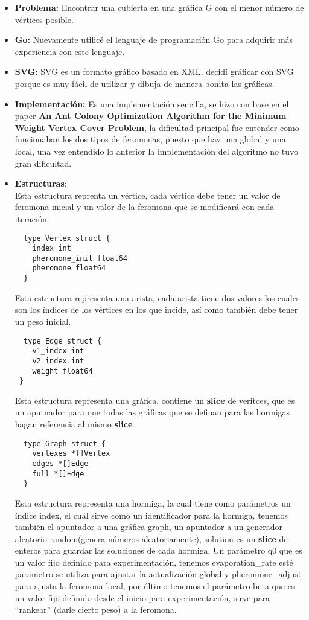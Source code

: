 \documentclass[a4paper, 11pt, spanish, oneside]{book}
\begin{document}
\begin{itemize}
 \item\textbf{Problema:} Encontrar una cubierta en una gráfica G con el menor número de vértices posible.
 \item\textbf{Go:} Nuevamente utilicé el lenguaje de programación Go para adquirir más experiencia con este lenguaje.
 \item\textbf{SVG:} SVG es un formato gráfico basado en XML, decidí gráficar con SVG porque es muy fácil de utilizar y dibuja de manera bonita las gráficas.
 \item\textbf{Implementación:} Es una implementación sencilla, se hizo con base en el paper \textbf{An Ant Colony Optimization Algorithm for the Minimum Weight Vertex Cover Problem}, la dificultad principal fue entender como funcionaban los dos tipos de feromonas, puesto que hay una global y una local, una vez entendido lo anterior la implementación del algoritmo no tuvo gran dificultad.
 \item\textbf{Estructuras}:\\
 Esta estructura reprenta un vértice, cada vértice debe tener un valor de feromona inicial y un valor de la feromona que se modificará con cada iteración.
 \begin{verbatim}
  type Vertex struct {
    index int
    pheromone_init float64
    pheromone float64
  }
 \end{verbatim}
 Esta estructura representa una arista, cada arista tiene dos valores los cuales son los índices de los vértices en los que incide, así como también debe tener un peso inicial.
 \begin{verbatim}
  type Edge struct {
    v1_index int
    v2_index int
    weight float64
 }
 \end{verbatim}
 \newpage
 Esta estructura representa una gráfica, contiene un \textbf{slice} de veritces, que es un aputnador para que todas las gráficas que se definan para las hormigas hagan referencia al mismo \textbf{slice}.
 \begin{verbatim}
  type Graph struct {
    vertexes *[]Vertex
    edges *[]Edge
    full *[]Edge
  }
 \end{verbatim}
 Esta estructura representa una hormiga, la cual tiene como parámetros un índice index, el cuál sirve como un identificador para la hormiga, tenemos también el apuntador a una gráfica graph, un apuntador a un generador aleatorio random(genera números aleatoriamente), solution es un \textbf{slice} de enteros para guardar las soluciones de cada hormiga. Un parámetro q0 que es un valor fijo definido para experimentación, tenemos evaporation\_rate esté parametro se utiliza para ajustar la actualización global y pheromone\_adjust para ajusta la feromona local, por último tenemos el parámetro beta que es un valor fijo definido desde el inicio para experimentación, sirve para ``rankear'' (darle cierto peso) a la feromona.
 

\end{itemize}
\end{document}
